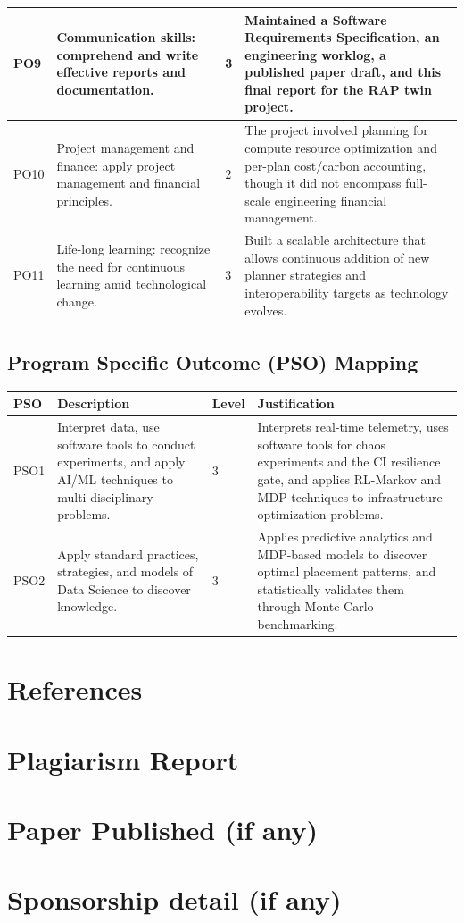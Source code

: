 \documentclass[12pt,a4]{report}
\begin{document}
\begin{appendices}
\begin{longtable}{|p{0.6cm}|p{6.3cm}|p{1cm}|p{6.5cm}|}
\hline
PO9 & Communication skills: comprehend and write effective reports and documentation. & 3 & Maintained a Software Requirements Specification, an engineering worklog, a published paper draft, and this final report for the RAP twin project. \\
\hline
PO10 & Project management and finance: apply project management and financial principles. & 2 & The project involved planning for compute resource optimization and per-plan cost/carbon accounting, though it did not encompass full-scale engineering financial management. \\
\hline
PO11 & Life-long learning: recognize the need for continuous learning amid technological change. & 3 & Built a scalable architecture that allows continuous addition of new planner strategies and interoperability targets as technology evolves. \\
\hline
\end{longtable}

\section{Program Specific Outcome (PSO) Mapping}

\begin{longtable}{|p{0.9cm}|p{6.3cm}|p{1.2cm}|p{6.3cm}|}
\hline
\textbf{PSO} & \textbf{Description} & \textbf{Level} & \textbf{Justification} \\
\hline
\endhead
PSO1 & Interpret data, use software tools to conduct experiments, and apply AI/ML techniques to multi-disciplinary problems. & 3 & Interprets real-time telemetry, uses software tools for chaos experiments and the CI resilience gate, and applies RL-Markov and MDP techniques to infrastructure-optimization problems. \\
\hline
PSO2 & Apply standard practices, strategies, and models of Data Science to discover knowledge. & 3 & Applies predictive analytics and MDP-based models to discover optimal placement patterns, and statistically validates them through Monte-Carlo benchmarking. \\
\hline
\end{longtable}

\chapter{References}

\chapter{Plagiarism Report }
\chapter{Paper Published (if any)}
\chapter{Sponsorship detail (if any)}
\end{appendices}
\end{document}
